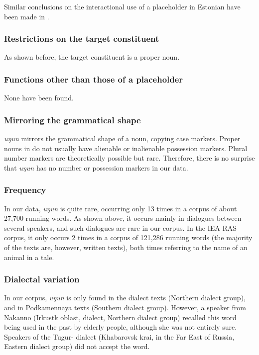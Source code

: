 \documentclass[output=paper,colorlinks,citecolor=brown]{langscibook}
\begin{document}
Similar conclusions on the interactional use of a placeholder in Estonian have been made in \citet{Keevallik2010}.


\subsubsection{Restrictions on the target constituent}

As shown before, the target constituent is a proper noun.

\subsubsection{Functions other than those of a placeholder}

None have been found.

\subsubsection{Mirroring the grammatical shape}

\textit{uŋun} mirrors the grammatical shape of a noun, copying case markers. Proper nouns in  do not usually have alienable or inalienable possession markers. Plural number markers are theoretically possible but rare. Therefore, there is no surprise that \textit{uŋun} has no number or possession markers in our data.


\subsubsection{Frequency}

In our data, \textit{uŋun} is quite rare, occurring only 13 times in a corpus of about 27,700 running words. As shown above, it occurs mainly in dialogues between several  speakers, and such dialogues are rare in our corpus. In the IEA RAS corpus, it only occurs 2 times in a corpus of 121,286 running words (the majority of the texts are, however, written texts), both times referring to the name of an animal in a tale.

\subsubsection{Dialectal variation}

In our corpus, \textit{uŋun} is only found in the  dialect texts (Northern dialect group), and in Podkamennaya  texts (Southern dialect group). However, a speaker from Nakanno (Irkustk oblast,  dialect, Northern dialect group) recalled this word being used in the past by elderly people, although she was not entirely sure. Speakers of the Tugur- dialect (Khabarovsk krai, in the Far East of Russia, Eastern dialect group) did not accept the word.
\end{document}
